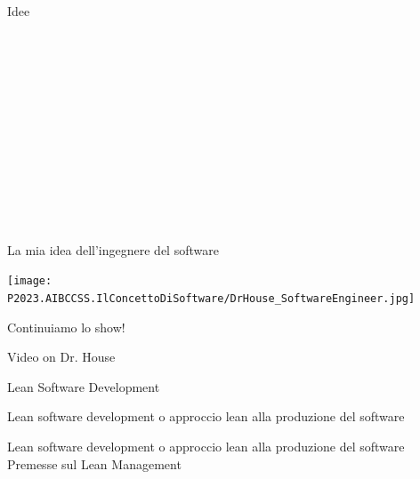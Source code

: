 \documentclass{beamer}
\begin{document}
\begin{frame}{\centerline{Idee}}
\noindent\makebox[\linewidth]{\rule{\paperwidth}{0.4pt}}\\
\vspace{0.5cm}

\noindent\makebox[\linewidth]{\rule{\paperwidth}{0.4pt}}\\
\vspace{0.5cm}

\noindent\makebox[\linewidth]{\rule{\paperwidth}{0.4pt}}\\
\vspace{0.5cm}

\noindent\makebox[\linewidth]{\rule{\paperwidth}{0.4pt}}\\
\vspace{0.5cm}

\noindent\makebox[\linewidth]{\rule{\paperwidth}{0.4pt}}\\
\vspace{0.5cm}

\noindent\makebox[\linewidth]{\rule{\paperwidth}{0.4pt}}\\
\vspace{0.5cm}

\noindent\makebox[\linewidth]{\rule{\paperwidth}{0.4pt}}\\

\end{frame}

\begin{frame}{\centerline{La mia idea dell'ingegnere del software}}

\begin{center}
\texttt{[image: P2023.AIBCCSS.IlConcettoDiSoftware/DrHouse\_SoftwareEngineer.jpg]}
\end{center}

\end{frame}

\begin{frame}{\centerline{Continuiamo lo show!}}
\vspace*{1.5cm}
\begin{center}
\Huge Video on Dr. House

\end{center}

\end{frame}

\begin{frame}{\centerline{Lean Software Development}}
Lean software development o approccio lean alla produzione del software\\
\vspace{1cm}
\begin{center}
Lean software development o approccio lean alla produzione del software\\
\vspace{1cm}
\LARGE
Premesse sul Lean Management
\end{center}
\end{frame}
\end{document}
